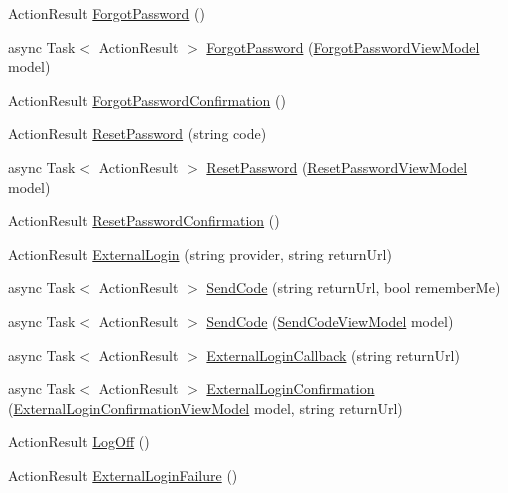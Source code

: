 \begin{DoxyCompactItemize}
\item 
Action\+Result \mbox{\hyperlink{class_brew_day2_1_1_controllers_1_1_account_controller_a926c610b5a53c8616b7ade4ee307aec5}{Forgot\+Password}} ()
\item 
async Task$<$ Action\+Result $>$ \mbox{\hyperlink{class_brew_day2_1_1_controllers_1_1_account_controller_a621e94f5b40afee98a8e4d1f71d98df2}{Forgot\+Password}} (\mbox{\hyperlink{class_brew_day2_1_1_models_1_1_forgot_password_view_model}{Forgot\+Password\+View\+Model}} model)
\item 
Action\+Result \mbox{\hyperlink{class_brew_day2_1_1_controllers_1_1_account_controller_a7f72627bc9dc939b4644c9568c4a10df}{Forgot\+Password\+Confirmation}} ()
\item 
Action\+Result \mbox{\hyperlink{class_brew_day2_1_1_controllers_1_1_account_controller_a80f3b0190c334d42097dd5eb48c5b96e}{Reset\+Password}} (string code)
\item 
async Task$<$ Action\+Result $>$ \mbox{\hyperlink{class_brew_day2_1_1_controllers_1_1_account_controller_ae26675fb414424336eca0e9ed38059de}{Reset\+Password}} (\mbox{\hyperlink{class_brew_day2_1_1_models_1_1_reset_password_view_model}{Reset\+Password\+View\+Model}} model)
\item 
Action\+Result \mbox{\hyperlink{class_brew_day2_1_1_controllers_1_1_account_controller_a749abda29fc866371b1652057b589ef8}{Reset\+Password\+Confirmation}} ()
\item 
Action\+Result \mbox{\hyperlink{class_brew_day2_1_1_controllers_1_1_account_controller_af94a683f03d5beabc0649a9c0da31384}{External\+Login}} (string provider, string return\+Url)
\item 
async Task$<$ Action\+Result $>$ \mbox{\hyperlink{class_brew_day2_1_1_controllers_1_1_account_controller_abce1e20a7e77c5304250abade4b35897}{Send\+Code}} (string return\+Url, bool remember\+Me)
\item 
async Task$<$ Action\+Result $>$ \mbox{\hyperlink{class_brew_day2_1_1_controllers_1_1_account_controller_ac93b86652a85a46288a77b760eb25cc3}{Send\+Code}} (\mbox{\hyperlink{class_brew_day2_1_1_models_1_1_send_code_view_model}{Send\+Code\+View\+Model}} model)
\item 
async Task$<$ Action\+Result $>$ \mbox{\hyperlink{class_brew_day2_1_1_controllers_1_1_account_controller_ad76992de3f6699ce8d3d66bbc8d4f106}{External\+Login\+Callback}} (string return\+Url)
\item 
async Task$<$ Action\+Result $>$ \mbox{\hyperlink{class_brew_day2_1_1_controllers_1_1_account_controller_a326099053cdf8551adfdbfa875a5e848}{External\+Login\+Confirmation}} (\mbox{\hyperlink{class_brew_day2_1_1_models_1_1_external_login_confirmation_view_model}{External\+Login\+Confirmation\+View\+Model}} model, string return\+Url)
\item 
Action\+Result \mbox{\hyperlink{class_brew_day2_1_1_controllers_1_1_account_controller_a82968fd6963ebb3a9ac80997bc7bd049}{Log\+Off}} ()
\item 
Action\+Result \mbox{\hyperlink{class_brew_day2_1_1_controllers_1_1_account_controller_a0ffcbe93ca47401da91b0b0c2d14abdd}{External\+Login\+Failure}} ()
\end{DoxyCompactItemize}
